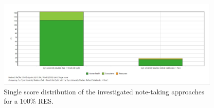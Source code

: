 \begin{figure}[H]
    \centering
    \includegraphics[width=\textwidth]{images/RES_100/Single_Score_RES_100.JPG}
    \caption{Single score distribution of the investigated note-taking approaches for a 100\% RES.}\label{fig:single_score_RES100}
\end{figure}
